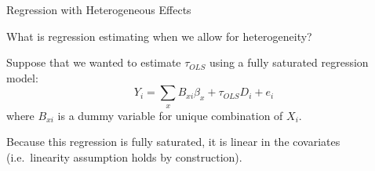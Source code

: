 \documentclass{beamer}
\numberwithin{equation}{section}
\newcommand{\indep}{{\bot\negthickspace\negthickspace\bot}}
\begin{document}
%
%
%
%
%

\begin{frame}{Regression with Heterogeneous Effects}

What is regression estimating when we allow for heterogeneity? \pause


Suppose that we wanted to estimate $\tau_{OLS}$ using a
\alert{fully saturated} regression model:
\[ Y_i = \sum_x B_{xi} \beta_x + \tau_{OLS} D_i + e_i\] where $B_{xi}$
is a dummy variable for unique combination of $X_i$.

Because this regression is fully saturated, it is linear in the
covariates (i.e.~linearity assumption holds by construction). %


\end{frame}
%
%
%
%
\end{document}
